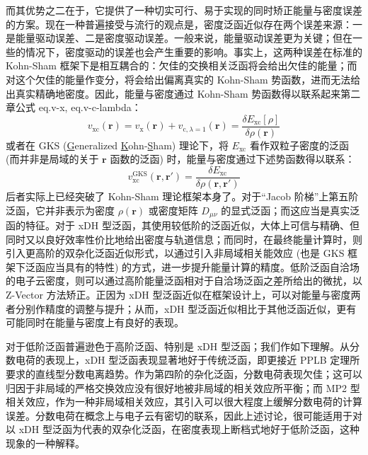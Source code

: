 而其优势之二在于，它提供了一种切实可行、易于实现的同时矫正能量与密度误差的方案。现在一种普遍接受与流行的观点是，密度泛函近似存在两个误差来源：一是能量驱动误差、二是密度驱动误差。一般来说，能量驱动误差更为关键\cite{Cohen-Yang.CR.2012}；但在一些的情况下，密度驱动的误差也会产生重要的影响\cite{Kim-Burke.JCP.2014}。事实上，这两种误差在标准的 Kohn-Sham 框架下是相互耦合的：欠佳的交换相关泛函将会给出欠佳的能量；而对这个欠佳的能量作变分，将会给出偏离真实的 Kohn-Sham 势函数，进而无法给出真实精确地密度。因此，能量与密度通过 Kohn-Sham 势函数得以联系起来\alert{第二章公式 eq.v-x, eq.v-c-lambda}：
\begin{equation}
    v_\mathrm{xc} (\bm{r}) = v_\mathrm{x} (\bm{r}) + v_{\mathrm{c}, \lambda=1} (\bm{r}) = \frac{\delta E_\mathrm{xc} [\rho]}{\delta \rho(\bm{r})}
\end{equation}
或者在 GKS (\underline{G}eneralized \underline{K}ohn-\underline{S}ham) 理论下，将 $E_\mathrm{xc}$ 看作双粒子密度的泛函 (而并非是局域的关于 $\bm{r}$ 函数的泛函) 时，能量与密度通过下述势函数得以联系：
\begin{equation}
    v_\mathrm{xc}^\mathrm{GKS} (\bm{r}, \bm{r}') = \frac{\delta E_\mathrm{xc}}{\delta \rho(\bm{r}, \bm{r}')}
\end{equation}
后者实际上已经突破了 Kohn-Sham 理论框架本身了\cite{Su-Xu.WCMS.2016, Su-Xu.IJQC.2015, Su-Xu.MP.2016}。对于“Jacob 阶梯”上第五阶泛函，它并非表示为密度 $\rho(\bm{r})$ 或密度矩阵 $D_{\mu \nu}$ 的显式泛函；而这应当是真实泛函的特征\cite{Kohn-Kohn.PRB.1986, Yang-Mori-Sanchez.JCP.2012}。对于 xDH 型泛函，其使用较低阶的泛函近似，大体上可信与精确、但同时又以良好效率性价比地给出密度与轨道信息；而同时，在最终能量计算时，则引入更高阶的双杂化泛函近似形式，以通过引入非局域相关能效应 (也是 GKS 框架下泛函应当具有的特性) 的方式，进一步提升能量计算的精度。低阶泛函自洽场的电子云密度，则可以通过高阶能量泛函相对于自洽场泛函之差所给出的微扰，以 Z-Vector 方法矫正\cite{Handy-Schaefer.JCP.1984, Su-Xu.JCC.2013}。正因为 xDH 型泛函近似在框架设计上，可以对能量与密度两者分别作精度的调整与提升；从而，xDH 型泛函近似相比于其他泛函近似，更有可能同时在能量与密度上有良好的表现。

对于低阶泛函普遍逊色于高阶泛函、特别是 xDH 型泛函；我们作如下理解。从分数电荷的表现上，xDH 型泛函表现显著地好于传统泛函\cite{Su-Xu.IJQC.2015, Su-Xu.WCMS.2016, Su-Xu.MP.2016, Su-Xu.ARPC.2017}，即更接近 PPLB 定理所要求的直线型分数电离趋势\cite{Perdew-Balduz.PRL.1982}。作为第四阶的杂化泛函，分数电荷表现欠佳；这可以归因于非局域的严格交换效应没有很好地被非局域的相关效应所平衡；而 MP2 型相关效应，作为一种非局域相关效应，其引入可以很大程度上缓解分数电荷的计算误差。分数电荷在概念上与电子云有密切的联系，因此上述讨论，很可能适用于对以 xDH 型泛函为代表的双杂化泛函，在密度表现上断档式地好于低阶泛函，这种现象的一种解释。

